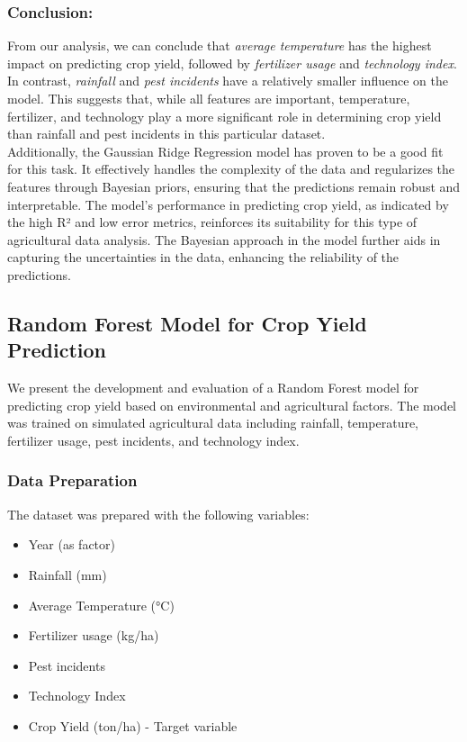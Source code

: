\subsubsection{Conclusion:}

From our analysis, we can conclude that \textit{average temperature} has the highest impact on predicting crop yield, followed by \textit{fertilizer usage} and \textit{technology index}. In contrast, \textit{rainfall} and \textit{pest incidents} have a relatively smaller influence on the model. This suggests that, while all features are important, temperature, fertilizer, and technology play a more significant role in determining crop yield than rainfall and pest incidents in this particular dataset. \\

Additionally, the Gaussian Ridge Regression model has proven to be a good fit for this task. It effectively handles the complexity of the data and regularizes the features through Bayesian priors, ensuring that the predictions remain robust and interpretable. The model's performance in predicting crop yield, as indicated by the high R² and low error metrics, reinforces its suitability for this type of agricultural data analysis. The Bayesian approach in the model further aids in capturing the uncertainties in the data, enhancing the reliability of the predictions.





\subsection{Random Forest Model for Crop Yield Prediction}

We present the development and evaluation of a Random Forest model for predicting crop yield based on environmental and agricultural factors. The model was trained on simulated agricultural data including rainfall, temperature, fertilizer usage, pest incidents, and technology index.

\subsubsection{Data Preparation}
The dataset was prepared with the following variables:
\begin{itemize}
    \item Year (as factor)
    \item Rainfall (mm)
    \item Average Temperature (°C)
    \item Fertilizer usage (kg/ha)
    \item Pest incidents
    \item Technology Index
    \item Crop Yield (ton/ha) - Target variable
\end{itemize}

